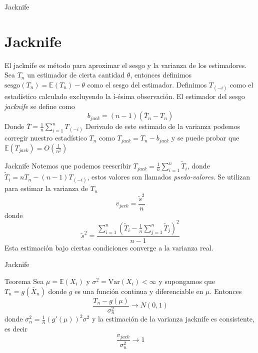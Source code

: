 \documentclass[aspectratio=169,spanish]{beamer}
\begin{document}
\begin{frame}{Jacknife}
\section{Jacknife}
El jacknife es método para aproximar el sesgo y la varianza de los estimadores. Sea $T_n$ un estimador de cierta cantidad $\theta$, entonces definimos $\text{sesgo}(T_n)=\mathbb{E}(T_n)-\theta$ como el sesgo del estimador. Definimos $T_{(-i)}$ como el estadístico calculado excluyendo la í-ésima observación. El estimador del sesgo \textit{jacknife} se define como $$b_{jack}=(n-1)(\bar{T}_n-T_n)$$ Donde $\bar{T}=\frac{1}{n}\sum_{i=1}^{n}T_{(-i)}$ Derivado de este estimado de la varianza podemos corregir nuestro estadístico $T_n$ como $T_{jack}=T_n - b_{jack}$ y se puede probar que $\mathbb{E}(T_{jack})=O(\frac{1}{n^2})$
\end{frame}

\begin{frame}{Jacknife}
Notemos que podemos reescribir $T_{jack}=\frac{1}{n}\sum_{i=1}^{n}\widetilde{T}_i$, donde $\widetilde{T}_i=nT_n-(n-1)T_{(-i)}$, estos valores son llamados \textit{psedo-valores}. Se utilizan para estimar la varianza de $T_n$ $$v_{jack}=\frac{\widetilde{s}^2}{n}$$ donde $$\widetilde{s}^2=\frac{\sum_{i=1}^{n}\left(\widetilde{T}_i-\frac{1}{n}\sum_{j=1}^{n}\widetilde{T}_j\right)^2}{n-1}$$
Esta estimación bajo ciertas condiciones converge a la varianza real. 
\end{frame}

\begin{frame}{Jacknife}
\begin{block}{Teorema}
Sea $\mu=\mathbb{E}(X_i)$ y $\sigma^{2}=\text{Var}(X_i)<\infty$ y supongamos que $T_n=g(\bar{X}_n)$ donde $g$ es una función continua y diferenciable en $\mu$. Entonces $$\frac{T_n-g(\mu)}{\sigma^{2}_n}\rightarrow N(0,1)$$ donde  $\sigma^{2}_n=\frac{1}{n}(g'(\mu))^2\sigma^2$ y la estimación de la varianza jacknife es consistente, es decir $$\frac{v_{jack}}{\sigma^{2}_n}\rightarrow 1$$ 
\end{block}
\end{frame}
\end{document}
